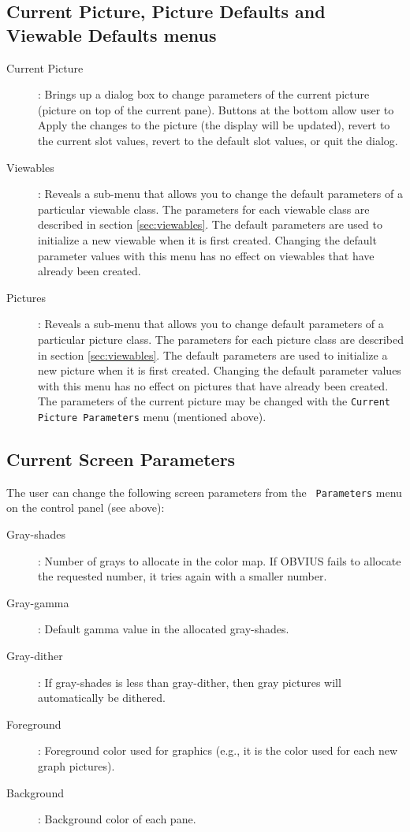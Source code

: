\subsection{Current Picture, Picture Defaults and Viewable Defaults menus}
\begin{description}
\item [Current Picture]: Brings up a dialog box to change parameters
of the current picture (picture on top of the current pane).  Buttons
at the bottom allow user to Apply the changes to the picture (the
display will be updated), revert to the current slot values, revert to
the default slot values, or quit the dialog.

\item [Viewables]: Reveals a sub-menu that allows you to change
the default parameters of a particular viewable class.  The parameters
for each viewable class are described in section \ref{sec:viewables}.
The default parameters are used to initialize a new viewable when it
is first created.  Changing the default parameter values with this
menu has no effect on viewables that have already been created.

\item [Pictures]: Reveals a sub-menu that allows you to change
default parameters of a particular picture class.  The parameters for
each picture class are described in section \ref{sec:viewables}.  The
default parameters are used to initialize a new picture when it is
first created.  Changing the default parameter values with this menu
has no effect on pictures that have already been created.  The
parameters of the current picture may be changed with the {\tt Current
Picture Parameters} menu (mentioned above).
\end{description}


\subsection{Current Screen Parameters}

The user can change the following screen parameters from the {\tt
Parameters} menu on the control panel (see above):
\begin{description}
\item [Gray-shades]: Number of grays to allocate in the color map.  If
OBVIUS fails to allocate the requested number, it tries again with a
smaller number.
\item [Gray-gamma]: Default gamma value in the allocated gray-shades.
\item [Gray-dither]: If gray-shades is less than gray-dither, then
gray pictures will automatically be dithered.
\item [Foreground]: Foreground color used for graphics (e.g., it is
the color used for each new graph pictures).
\item [Background]: Background color of each pane.
\end{description}

